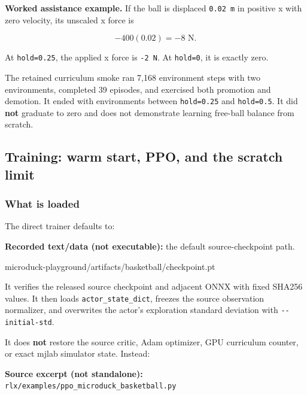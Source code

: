 \documentclass[
  american,
  11pt,
  letterpaper,
]{article}
\newenvironment{Shaded}{\begin{snugshade}}{\end{snugshade}}
\newcommand{\NormalTok}[1]{#1}
\renewenvironment{Shaded}{\par\smallskip}{\par\smallskip}
\begin{document}
\textbf{Worked assistance example.} If the ball is displaced
\texttt{0.02\ m} in positive x with zero velocity, its unscaled x force
is

\[
-400(0.02)=-8\text{ N}.
\]

At \texttt{hold=0.25}, the applied x force is \texttt{-2\ N}. At
\texttt{hold=0}, it is exactly zero.

The retained curriculum smoke ran 7,168 environment steps with two
environments, completed 39 episodes, and exercised both promotion and
demotion. It ended with environments between \texttt{hold=0.25} and
\texttt{hold=0.5}. It did \textbf{not} graduate to zero and does not
demonstrate learning free-ball balance from scratch.

\subsection{Training: warm start, PPO, and the scratch
limit}\label{training-warm-start-ppo-and-the-scratch-limit}

\subsubsection{What is loaded}\label{what-is-loaded}

The direct trainer defaults to:

\textbf{Recorded text/data (not executable):} the default
source-checkpoint path.

\begin{Shaded}
\begin{Highlighting}[]
\NormalTok{microduck{-}playground/artifacts/basketball/checkpoint.pt}
\end{Highlighting}
\end{Shaded}

It verifies the released source checkpoint and adjacent ONNX with fixed
SHA256 values. It then loads
\texttt{actor\_\allowbreak{}state\_\allowbreak{}dict}, freezes the
source observation normalizer, and overwrites the actor's exploration
standard deviation with
\texttt{-\allowbreak{}-\allowbreak{}initial-\allowbreak{}std}.

It does \textbf{not} restore the source critic, Adam optimizer, GPU
curriculum counter, or exact mjlab simulator state. Instead:

\textbf{Source excerpt (not standalone):}
\texttt{rlx/\allowbreak{}examples\allowbreak{}/\allowbreak{}ppo\_\allowbreak{}microduc\allowbreak{}k\_\allowbreak{}basketba\allowbreak{}ll.py}
\end{document}
